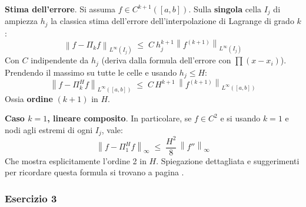 \begin{enumerate}
    \textbf{Stima dell'errore}. Si assuma $f \in C^{k+1}\left(\left[a,b\right]\right)$. Sulla \textbf{singola} cella $I_{j}$ di ampiezza $h_{j}$ la classica stima dell'errore dell'interpolazione di Lagrange di grado $k$:
    \begin{equation*}
        \left\| f - \Pi_{k} f \right\|_{L^\infty \left(I_j\right)} \; \le \; C \: h_{j}^{k+1} \left\| f^{\left(k+1\right)} \right\|_{L^{\infty} \left(I_{j}\right)}
    \end{equation*}
    Con $C$ indipendente da $h_{j}$ (deriva dalla formula dell'errore con $\prod \left(x-x_{i}\right)$). Prendendo il massimo su tutte le celle e usando $h_{j} \le H$:
    \begin{equation*}
        \left\| f - \Pi_{k}^{H} f \right\|_{L^{\infty}\left(\left[a,b\right]\right)} \; \le \;
        C \, H^{k+1} \, \left\| f^{\left(k+1\right)} \right\|_{L^{\infty}\left(\left[a,b\right]\right)}
    \end{equation*}
    Ossia \textbf{ordine} $\left(k+1\right)$ in $H$.

    \textbf{Caso $k=1$, lineare composito}. In particolare, se $f \in C^{2}$ e si usando $k=1$ e nodi agli estremi di ogni $I_{j}$, vale:
    \begin{equation*}
        \left\| f - \Pi_{1}^{H} f \right\|_{\infty} \; \le \; \dfrac{H^{2}}{8} \, \left\| f'' \right\|_{\infty}
    \end{equation*}
    Che mostra esplicitamente l'ordine 2 in $H$. Spiegazione dettagliata e suggerimenti per ricordare questa formula si trovano a pagina \pageref{takeaways:interpolazione_composita}.
\end{enumerate}

\newpage

\subsubsection*{Esercizio 3}

